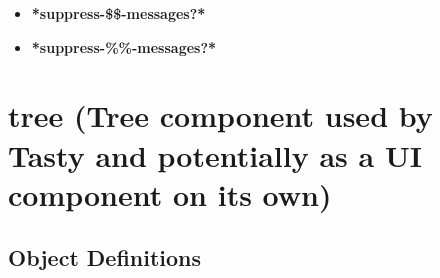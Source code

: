\documentclass [11pt]{book}
\begin{document}
\begin{itemize}

\item {}
\label{prim:*suppress-dollardollar-messages?*}
\textbf{*suppress-\$\$-messages?*}





\item {}
\label{prim:*suppress-percentpercent-messages?*}
\textbf{*suppress-\%\%-messages?*}





\end{itemize}





\section{tree (Tree component used by Tasty and potentially as a UI component on its own)}

\label{sec:tree(treecomponentusedbytastyandpotentiallyasauicomponentonitsown)}





\subsection{Object Definitions}

\label{subsec:objectdefinitions}
\end{document}
